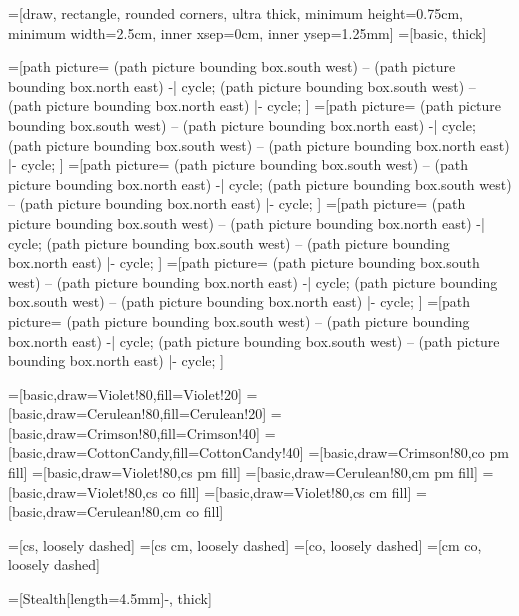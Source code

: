 \documentclass[12pt]{article}
\begin{document}
=[draw, rectangle, rounded corners, ultra thick, minimum height=0.75cm, minimum width=2.5cm, inner xsep=0cm, inner ysep=1.25mm]
=[basic, thick]

\newcommand\HalfFill[2] {
    \fill[#1] (path picture bounding box.south west)
    -- (path picture bounding box.north east) -| cycle;
    \fill[#2] (path picture bounding box.south west)
    -- (path picture bounding box.north east) |- cycle;
}

=[path picture={\HalfFill{Crimson!40}{CottonCandy!40}}]
=[path picture={\HalfFill{Violet!20}{CottonCandy!40}}]
=[path picture={\HalfFill{Cerulean!20}{CottonCandy!40}}]
=[path picture={\HalfFill{Violet!20}{Crimson!40}}]
=[path picture={\HalfFill{Violet!20}{Cerulean!20}}]
=[path picture={\HalfFill{Cerulean!20}{Crimson!40}}]

=[basic,draw=Violet!80,fill=Violet!20]
=[basic,draw=Cerulean!80,fill=Cerulean!20]
=[basic,draw=Crimson!80,fill=Crimson!40]
=[basic,draw=CottonCandy,fill=CottonCandy!40]
=[basic,draw=Crimson!80,co pm fill]
=[basic,draw=Violet!80,cs pm fill]
=[basic,draw=Cerulean!80,cm pm fill]
=[basic,draw=Violet!80,cs co fill]
=[basic,draw=Violet!80,cs cm fill]
=[basic,draw=Cerulean!80,cm co fill]

=[cs, loosely dashed]
=[cs cm, loosely dashed]
=[co, loosely dashed]
=[cm co, loosely dashed]

=[{Stealth[length=4.5mm]}-, thick]

\newcommand\DrawCourses[2][3 cm] {
    \foreach \title/\style in {#2} {
        \node (\title) [\style, right=#1 of last, alias=last] {\title};
    }
}

\newcommand\PlaceCourses[1] {
    \foreach \title/\style/\dist in {#1} {
        \node (\title) [\style, right=\dist of last, alias=last] {\title};
    }
}

\newcommand\PutCourses[1] {
    \foreach \title/\style/\place/\dist in {#1} {
        \node (\title) [\style, \place=\dist, alias=last] {\title};
    }
}
\end{document}
